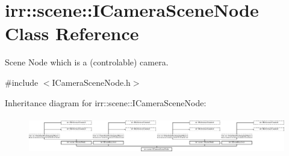\hypertarget{classirr_1_1scene_1_1ICameraSceneNode}{}\section{irr\+:\+:scene\+:\+:I\+Camera\+Scene\+Node Class Reference}
\label{classirr_1_1scene_1_1ICameraSceneNode}


Scene Node which is a (controlable) camera.  




{\ttfamily \#include $<$I\+Camera\+Scene\+Node.\+h$>$}

Inheritance diagram for irr\+:\+:scene\+:\+:I\+Camera\+Scene\+Node\+:\begin{figure}[H]
\begin{center}
\leavevmode
\includegraphics[height=1.682692cm]{classirr_1_1scene_1_1ICameraSceneNode}
\end{center}
\end{figure}
